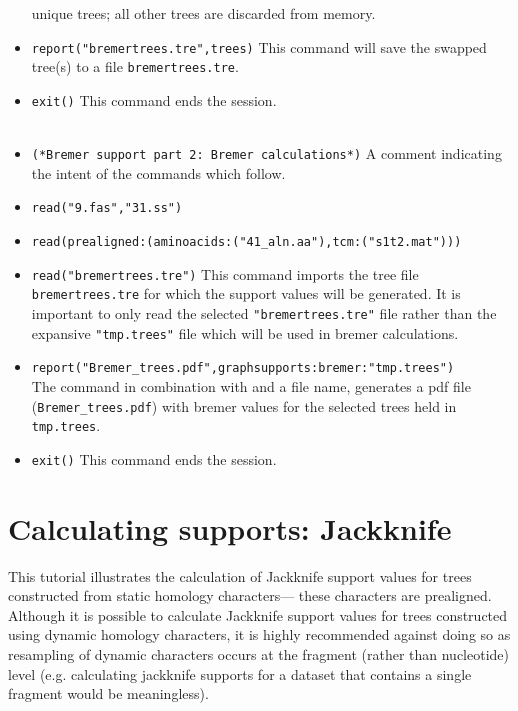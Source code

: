 \begin{itemize}
 unique trees; all other trees are discarded from memory.
\item \texttt{report("bremertrees.tre",trees)} This command will
save the swapped tree(s) to a file \texttt{bremertrees.tre}.  
\item \texttt{exit()} This command ends the \poy session.  
\\ 
\\ 
\item \texttt{(*Bremer support part 2: Bremer calculations*)}  A comment
indicating the intent of the commands which follow.  
\item \texttt{read("9.fas","31.ss")} 
\item \texttt{read(prealigned:(aminoacids:("41\_aln.aa"),tcm:("s1t2.mat")))}
\item \texttt{read("bremertrees.tre")} This command imports the
tree file \\ \texttt{bremertrees.tre} for which the support values
will be generated.  It is important to only read the selected
\texttt{"bremertrees.tre"} file rather than the expansive
\texttt{"tmp.trees"} file which will be used in bremer calculations.
\item \texttt{report("Bremer\_trees.pdf",graphsupports:bremer:"tmp.trees")}
\\The {} command in combination with
 and a file name, generates a pdf file
(\texttt{Bremer\_trees.pdf}) with bremer values for the selected
trees held in \texttt{tmp.trees}.  
\item \texttt{exit()} This command ends the \poy session.
\end{itemize}


\section{Calculating supports: Jackknife}{\label{tutorial5}}

This tutorial illustrates the calculation of Jackknife support 
values for trees constructed from static homology characters---
these characters are prealigned.  Although it is possible to 
calculate Jackknife support values for trees constructed 
using dynamic homology characters, it is highly recommended 
against doing so as resampling of dynamic characters occurs at 
the fragment (rather than nucleotide) level (e.g. calculating 
jackknife supports for a dataset that contains a single fragment 
would be meaningless). 

